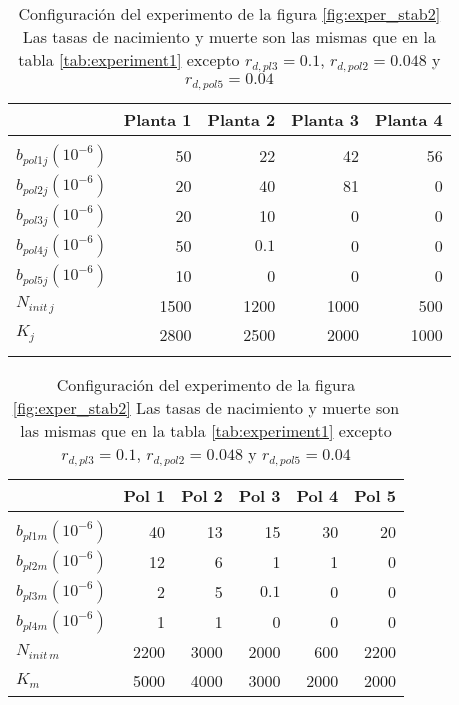 \begin{table}[h!]
\centering
\footnotesize
\begin{tabular}{lrrrr}
\hline
 & Planta 1 & Planta 2 & Planta 3 & Planta 4  \\
\hline
\\
$b_{pol1j}\left(10^{-6}\right)$ & 50 & 22 & 42 & 56 \\
$b_{pol2j}\left(10^{-6}\right)$ & 20 & 40 & 81 & 0 \\
$b_{pol3j}\left(10^{-6}\right)$ & 20 & 10 & 0 & 0 \\
$b_{pol4j}\left(10^{-6}\right)$ & 50 & $0.1$ & 0 & 0 \\
$b_{pol5j}\left(10^{-6}\right)$ & 10 & 0 & 0 & 0 \\
$N_{init\,j}$ & 1500 & 1200 & 1000 & 500 \\
$K_{j}$ & 2800 & 2500 & 2000 & 1000 \\

\hline
\\
\end{tabular}

\begin{tabular}{lrrrrr}
\hline
 &Pol 1&Pol 2&Pol 3&Pol 4&Pol 5\\
\hline
\\
$b_{pl1m}\left(10^{-6}\right)$ & 40 & 13 & 15 & 30 & 20\\
$b_{pl2m}\left(10^{-6}\right)$ & 12 & 6 & 1 & 1 & 0\\
$b_{pl3m}\left(10^{-6}\right)$ & 2 & 5 & $0.1$ & 0 & 0\\
$b_{pl4m}\left(10^{-6}\right)$ & 1 & 1 & 0 & 0 & 0\\
$N_{init\,m}$ & 2200 & 3000 & 2000 & 600 & 2200 \\
$K_{m}$& 5000 & 4000 & 3000 & 2000 & 2000\\
\hline
\end{tabular}
\normalsize
\caption{Configuración del experimento de la figura \ref{fig:exper_stab2} Las tasas de nacimiento y muerte son las mismas que en la tabla \ref{tab:experiment1} excepto $r_{d,pl3}=0.1$, $r_{d,pol2}=0.048$ y $r_{d,pol5}=0.04$}
\label{tab:experiment2}
\end{table}


